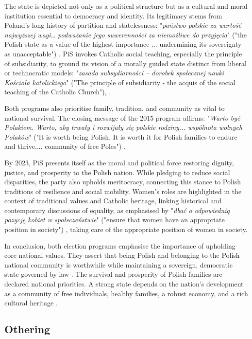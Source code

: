 The state is depicted not only as a political structure but as a cultural and moral institution essential to democracy and identity. Its legitimacy stems from Poland’s long history of partition and statelessness: "\textit{państwo polskie za wartość najwyższej wagi… podważanie jego suwerenności za niemożliwe do przyjęcia}" ("the Polish state as a value of the highest importance ... undermining its sovereignty as unacceptable") \citep{pis_program_2014}. PiS invokes Catholic social teaching, especially the principle of subsidiarity, to ground its vision of a morally guided state distinct from liberal or technocratic models: "\textit{zasada subsydiarności – dorobek społecznej nauki Kościoła katolickiego}" ("The principle of subsidiarity - the acquis of the social teaching of the Catholic Church"), \citep{pis_program_2023}.

Both programs also prioritise family, tradition, and community as vital to national survival. The closing message of the 2015 program affirms: "\textit{Warto być Polakiem. Warto, aby trwały i rozwijały się polskie rodziny... wspólnota wolnych Polaków}" ("It is worth being Polish. It is worth it for Polish families to endure and thrive.... community of free Poles") \citep{pis_program_2014}.

By 2023, PiS presents itself as the moral and political force restoring dignity, justice, and prosperity to the Polish nation. While pledging to reduce social disparities, the party also upholds meritocracy, connecting this stance to Polish traditions of resilience and social mobility. Women's roles are highlighted in the context of traditional values and Catholic heritage, linking historical and contemporary discussions of equality, as emphasised by "\textit{dbać o odpowiednią pozycję kobiet w społeczeństwie}" ("ensure that women have an appropriate position in society") \citep{pis_program_2023}, taking care of the appropriate position of women in society.

In conclusion, both election programs emphasise the importance of upholding core national values. They assert that being Polish and belonging to the Polish national community is worthwhile while maintaining a sovereign, democratic state governed by law \citep{pis_program_2014}. The survival and prosperity of Polish families are declared national priorities. A strong state depends on the nation's development as a community of free individuals, healthy families, a robust economy, and a rich cultural heritage \citep{pis_program_2023}.


\subsection{Othering}

